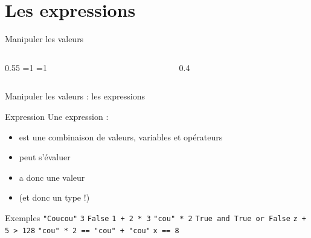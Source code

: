 \documentclass{beamer}
\newcommand{\valline}[3]{%
	\ifnum#3=1
	\else
	\fi
}
\begin{document}
\section{Les expressions}

\begin{frame}[t]{Manipuler les valeurs}
	\begin{columns}[T]
		\begin{column}{0.55\textwidth}
			\valline{code/echange_valeurs.py}{1-4}{0}\valline{code/echange_valeurs.py}{5-5}{1}
		\end{column}
		\begin{column}{0.4\textwidth}
		\end{column}
	\end{columns}
\end{frame}

\begin{frame}{Manipuler les valeurs : les expressions}
  \begin{block}{Expression}
    \vspace{0pt}
  Une expression :

  \begin{itemize}
    \item est une combinaison de valeurs, variables et opérateurs
    \item peut s'évaluer
    \item a donc une valeur
    \item (et donc un type !)
    \end{itemize}
    \end{block}

    \begin{exampleblock}{Exemples}
      \vspace{0pt}
        \texttt{"Coucou"}
          \pause
        \qquad \texttt{3}
          \pause
        \qquad \texttt{False}
          \pause
        \qquad \texttt{1 + 2 * 3}
          \pause
        \qquad \texttt{"cou" * 2}
          \pause
        \qquad \texttt{True and True or False}
          \pause
        \qquad \texttt{z + 5 > 128}
          \pause
        \qquad \texttt{"cou" * 2 == "cou" + "cou"}
          \pause
        \qquad \texttt{x == 8}
          \pause
        \qquad {}
        \pause
      \end{exampleblock}
\end{frame}
\end{document}
